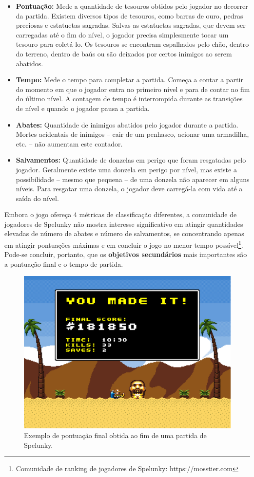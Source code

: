 \begin{itemize}
	\item \textbf{Pontuação:} Mede a quantidade de tesouros obtidos pelo jogador
	no decorrer da partida. Existem diversos tipos de tesouros, como barras de
	ouro, pedras preciosas e estatuetas sagradas. Salvas as estatuetas sagradas,
	que devem ser carregadas até o fim do nível, o jogador precisa simplesmente
	tocar um tesouro para coletá-lo. Os tesouros se encontram espalhados pelo
	chão, dentro do terreno, dentro de baús ou são deixados por certos inimigos
	ao serem abatidos.

	\item \textbf{Tempo:} Mede o tempo para completar a partida. Começa a contar
	a partir do momento em que o jogador entra no primeiro nível e para de
	contar no fim do último nível. A contagem de tempo é interrompida durante as
	transições de nível e quando o jogador pausa a partida.

	\item \textbf{Abates:} Quantidade de inimigos abatidos pelo jogador durante
	a partida. Mortes acidentais de inimigos -- cair de um penhasco, acionar uma
	armadilha, etc. -- não aumentam este contador.

	\item \textbf{Salvamentos:} Quantidade de donzelas em perigo que foram
	resgatadas pelo jogador. Geralmente existe uma donzela em perigo por nível,
	mas existe a possibilidade -- mesmo que pequena -- de uma donzela não
	aparecer em alguns níveis. Para resgatar uma donzela, o jogador deve
	carregá-la com vida até a saída do nível.
\end{itemize}

Embora o jogo ofereça 4 métricas de classificação diferentes, a comunidade de
jogadores de Spelunky não mostra interesse significativo em atingir quantidades
elevadas de número de abates e número de salvamentos, se concentrando apenas em
atingir pontuações máximas e em concluir o jogo no menor tempo
possível\footnote{Comunidade de ranking de jogadores de Spelunky:
https://mosstier.com}. Pode-se concluir, portanto, que os \textbf{objetivos
secundários} mais importantes são a pontuação final e o tempo de partida.

\begin{figure}[htb!]
\centering
\includegraphics[width=.65\textwidth]{fig/spelunky-score.pdf}
\caption{\label{fig:spelunky-scores}Exemplo de pontuação final obtida ao fim de
uma partida de Spelunky.}
\end{figure}


